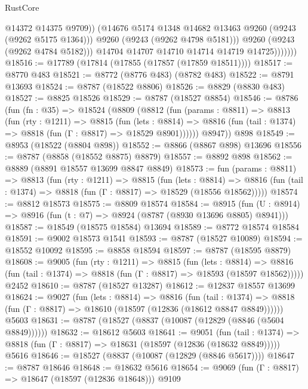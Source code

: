 \begin{lexlean}{RustCore}
\begin{coremodule}
                          @14372
                          @14375
                          @9709))
                      (@14676 @5174 @1348 @14682 @13463 @9260 (@9243 (@9262 @5175 @1364)))
                      @9260
                      (@9243 (@9262 @4798 @5181)))
                    @9260
                    (@9243 (@9262 @4784 @5182)))
                  @14704
                  @14707
                  @14710
                  @14714
                  @14719
                  @14725)))))))
@18516 := @17789 (@17814 (@17855 (@17857 (@17859 @18511))))
@18517 := @8770 @483
@18521 := @8772 (@8776 @483) (@8782 @483)
@18522 := @8791 @13693
@18524 := @8787 (@18522 @8806)
@18526 := @8829 (@8830 @483)
@18527 := @8825 @18526
@18529 := @8787 (@18527 @8854)
@18546 := @8786
    (fun (fn : @35) =>
    @18524
      (@8809
        (@8812
          (fun (params : @8811) =>
          @8813
            (fun (rty : @1211) =>
            @8815
              (fun (lets : @8814) =>
              @8816 (fun (tail : @1374) => @8818 (fun (Γ : @8817) => @18529 @8901))))))
        @8947))
    @898
@18549 := @8953 (@18522 (@8804 @898))
@18552 := @8866 (@8867 @898) @13696
@18556 := @8787 (@8858 (@18552 @8875) @8879)
@18557 := @8892 @898
@18562 := @8889 (@8891 @18557 @13699 @8847 @8849)
@18573 := fun (params : @8811) =>
  @8813
    (fun (rty : @1211) =>
    @8815
      (fun (lets : @8814) =>
      @8816 (fun (tail : @1374) => @8818 (fun (Γ : @8817) => @18529 (@18556 @18562)))))
@18574 := @8812 @18573
@18575 := @8809 @18574
@18584 := @8915
    (fun (U : @8914) => @8916 (fun (t : @7) => @8924 (@8787 (@8930 @13696 @8805) @8941)))
@18587 := @18549 (@18575 @18584) @13694
@18589 := @8772 @18574 @18584
@18591 := @9002 @18573 @1541
@18593 := @8787 (@18527 @10089)
@18594 := @18552 @10092
@18595 := @8858 @18594
@18597 := @8787 (@18595 @8879)
@18608 := @9005
    (fun (rty : @1211) =>
    @8815
      (fun (lets : @8814) =>
      @8816 (fun (tail : @1374) => @8818 (fun (Γ : @8817) => @18593 (@18597 @18562)))))
    @2452
@18610 := @8787 (@18527 @13287)
@18612 := @12837 @18557 @13699
@18624 := @9027
    (fun (lets : @8814) =>
    @8816
      (fun (tail : @1374) =>
      @8818 (fun (Γ : @8817) => @18610 (@18597 (@12836 (@18612 @8847 @8849))))))
    @5603
@18631 := @8787 (@18527 (@8837 (@10087 (@12829 (@8846 (@5604 @8849))))))
@18632 := @18612 @5603
@18641 := @9051
    (fun (tail : @1374) => @8818 (fun (Γ : @8817) => @18631 (@18597 (@12836 (@18632 @8849)))))
    @5616
@18646 := @18527 (@8837 (@10087 (@12829 (@8846 @5617))))
@18647 := @8787 @18646
@18648 := @18632 @5616
@18654 := @9069 (fun (Γ : @8817) => @18647 (@18597 (@12836 @18648))) @9109

\end{coremodule}
\end{lexlean}
